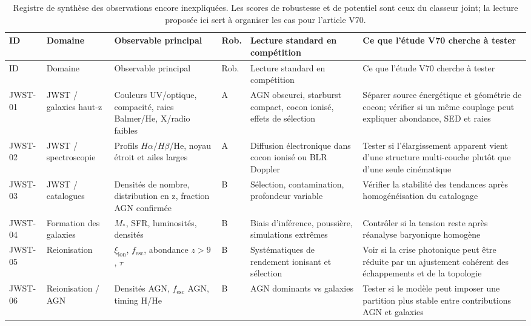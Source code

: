 \begin{longtable}{>{\raggedright\arraybackslash}p{2.0cm}>{\raggedright\arraybackslash}p{2.6cm}>{\raggedright\arraybackslash}p{2.8cm}>{\raggedright\arraybackslash}p{1.0cm}>{\raggedright\arraybackslash}p{4.0cm}>{\raggedright\arraybackslash}p{4.0cm}}
\caption{Registre de synthèse des observations encore inexpliquées. Les scores de robustesse et de potentiel sont ceux du classeur joint; la lecture proposée ici sert à organiser les cas pour l'article V70.}\label{tab:observation-studies}\\
\toprule
ID & Domaine & Observable principal & Rob. & Lecture standard en compétition & Ce que l'étude V70 cherche à tester \\
\midrule
\endfirsthead
\toprule
ID & Domaine & Observable principal & Rob. & Lecture standard en compétition & Ce que l'étude V70 cherche à tester \\
\midrule
\endhead
JWST-01 & JWST / galaxies haut-z & Couleurs UV/optique, compacité, raies Balmer/He, X/radio faibles & A & AGN obscurci, starburst compact, cocon ionisé, effets de sélection & Séparer source énergétique et géométrie de cocon; vérifier si un même couplage peut expliquer abondance, SED et raies \\
JWST-02 & JWST / spectroscopie & Profils $H\alpha/H\beta$/He, noyau étroit et ailes larges & A & Diffusion électronique dans cocon ionisé ou BLR Doppler & Tester si l'élargissement apparent vient d'une structure multi-couche plutôt que d'une seule cinématique \\
JWST-03 & JWST / catalogues & Densités de nombre, distribution en z, fraction AGN confirmée & B & Sélection, contamination, profondeur variable & Vérifier la stabilité des tendances après homogénéisation du catalogage \\
JWST-04 & Formation des galaxies & $M_*$, SFR, luminosités, densités & B & Biais d'inférence, poussière, simulations extrêmes & Contrôler si la tension reste après réanalyse baryonique homogène \\
JWST-05 & Reionisation & $\xi_{\mathrm{ion}}$, $f_{\mathrm{esc}}$, abondance $z>9$, $\tau$ & B & Systématiques de rendement ionisant et sélection & Voir si la crise photonique peut être réduite par un ajustement cohérent des échappements et de la topologie \\
JWST-06 & Reionisation / AGN & Densités AGN, $f_{\mathrm{esc}}$ AGN, timing H/He & B & AGN dominants vs galaxies & Tester si le modèle peut imposer une partition plus stable entre contributions AGN et galaxies \\

\end{longtable}
